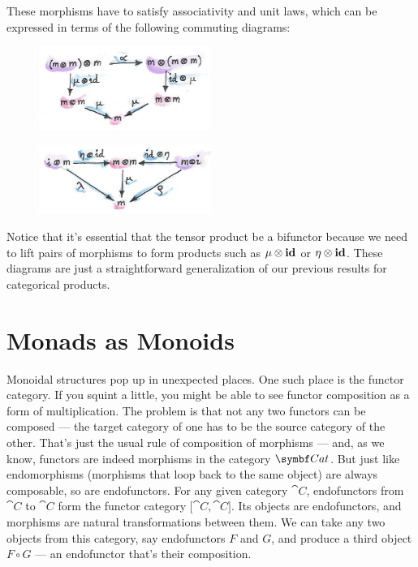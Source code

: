 \noindent
These morphisms have to satisfy associativity and unit laws, which can
be expressed in terms of the following commuting diagrams:

\begin{figure}[H]
  \centering
  \includegraphics[width=0.5\textwidth]{images/assoctensor.jpg}
\end{figure}

\begin{figure}[H]
  \centering
  \includegraphics[width=0.5\textwidth]{images/unitmon.jpg}
\end{figure}

\noindent
Notice that it's essential that the tensor product be a bifunctor
because we need to lift pairs of morphisms to form products such as
$\mu \otimes \mathbf{id}$ or $\eta \otimes \mathbf{id}$. These diagrams are just a
straightforward generalization of our previous results for categorical
products.

\section{Monads as Monoids}

Monoidal structures pop up in unexpected places. One such place is the
functor category. If you squint a little, you might be able to see
functor composition as a form of multiplication. The problem is that not
any two functors can be composed --- the target category of one has to
be the source category of the other. That's just the usual rule of
composition of morphisms --- and, as we know, functors are indeed
morphisms in the category $\Cat$. But just like endomorphisms
(morphisms that loop back to the same object) are always composable, so
are endofunctors. For any given category $\cat{C}$, endofunctors from
$\cat{C}$ to $\cat{C}$ form the functor category ${[}\cat{C}, \cat{C}{]}$. Its
objects are endofunctors, and morphisms are natural transformations
between them. We can take any two objects from this category, say
endofunctors $F$ and $G$, and produce a third object $F \circ G$ ---
an endofunctor that's their composition.

